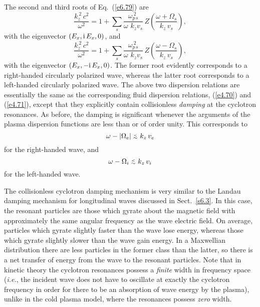The second and third roots of Eq.~(\ref{e6.79}) are
\begin{equation}
\frac{k_z^{~2}\,c^2}{\omega^2} = 1 +\sum_s \frac{\omega_{p\,s}^{~2}}{\omega\,
\,k_z v_s}\,Z\!\left(\frac{\omega + {\Omega}_s}{k_z\,v_s}\right),
\end{equation}
with the eigenvector $(E_x, {\rm i}\,E_x, 0)$, and
\begin{equation}
\frac{k_z^{~2}\,c^2}{\omega^2} = 1 +\sum_s \frac{\omega_{p\,s}^{~2}}{\omega\,
\,k_z v_s}\,Z\!\left(\frac{\omega - {\Omega}_s}{k_z\,v_s}\right),
\end{equation}
with the eigenvector $(E_x, -{\rm i}\,E_x, 0)$. The former root evidently
corresponds to a right-handed circularly polarized wave, whereas the latter
root corresponds to a left-handed circularly polarized wave. 
The above two dispersion relations are essentially the same as the corresponding
fluid dispersion relations, (\ref{e4.70}) and (\ref{e4.71}), except that they explicitly
contain collisionless {\em damping}\/ at the cyclotron resonances. As before, the
damping is significant whenever the arguments of the plasma dispersion functions
are less than or of order unity. This corresponds to
\begin{equation}
\omega - |{\Omega}_e| \stackrel {_{\normalsize<}}{_{\normalsize \sim}} k_z\,v_e
\end{equation}
for the right-handed wave, and
\begin{equation}
\omega-{\Omega}_i\stackrel {_{\normalsize<}}{_{\normalsize \sim}} k_z\,v_i
\end{equation}
for the left-handed wave. 

The collisionless cyclotron damping mechanism is very similar to the
Landau damping mechanism for longitudinal waves discussed in Sect.~\ref{s6.3}. 
In this case, the resonant particles are those which gyrate about the magnetic
field with approximately the same angular frequency as the wave electric field.
On average, particles which gyrate slightly faster than the wave lose energy, whereas those which gyrate slightly slower than the wave gain
energy. In a Maxwellian distribution there are less particles in the former
class  than the latter, so there is a net transfer of energy from
the wave to the resonant particles. Note that in kinetic theory
the cyclotron resonances
possess a {\em finite}\/ width in frequency space ({\em i.e.}, the incident wave does
not have to oscillate at exactly the cyclotron frequency in order for there
to be an absorption of wave energy by the plasma), unlike in the cold plasma
model, where the resonances possess {\em zero}\/ width. 

